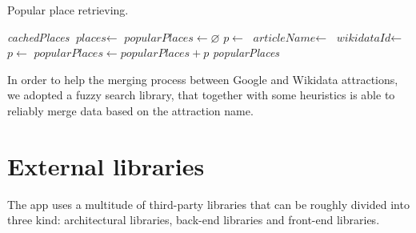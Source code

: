 \documentclass[a4paper, 11pt, parskip=half]{scrreprt}
\theoremstyle{definition}
\begin{document}
\begin{algorithm}
    \caption{Popular place retrieving.}
    \begin{algorithmic}[1]
                \State \Return \textit{cachedPlaces}
            \Else
                \State $\textit{places} \gets$ 
                \State $\textit{popularPlaces} \gets \varnothing$
                    \State $p \gets$ 
                    \State $\textit{articleName} \gets$ 
                    \State $\textit{wikidataId} \gets$ 
                    \State $p \gets$ 
                    \State $\textit{popularPlaces} \gets \textit{popularPlaces} + p$
                \EndFor
                \State {}
                \State \Return \textit{popularPlaces}
            \EndIf
        \EndProcedure
    \end{algorithmic}
\end{algorithm}

In order to help the merging process between Google and Wikidata attractions, we adopted a fuzzy search library, that together with some heuristics is able to reliably merge data based on the attraction name.

\section{External libraries}

The app uses a multitude of third-party libraries that can be roughly divided into three kind: architectural libraries, back-end libraries and front-end libraries.
\end{document}
